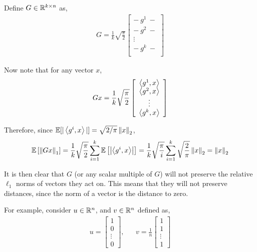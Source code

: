 \documentclass[10pt]{article}
\begin{document}
\begin{solution}[Solution]
    Define \( G\in\mathbb{R}^{k\times n} \) as, 
\begin{align*}
    G = \frac{1}{k} \sqrt{\frac{\pi}{2}} \left[\begin{array}{c}
    -\: g^1 \: - \\
    -\: g^2 \: - \\
    \vdots \\
    -\: g^k \: - \\
    \end{array}\right]
\end{align*}

Now note that for any vector \( x \),
\begin{align*}
    Gx = \frac{1}{k} \sqrt{\frac{\pi}{2}} \left[\begin{array}{c} \left\langle g^1,x \right\rangle \\ \left\langle g^2,x \right\rangle \\ \vdots \\ \left\langle g^k,x \right\rangle\end{array}\right]
\end{align*}

    Therefore, since \( \mathbb{E}[|\left\langle g^i,x \right\rangle|] = \sqrt{2/\pi} \left\lVert x\right\rVert_2 \),
\begin{align*}
    \mathbb{E} \left[\left\lVert Gx\right\rVert_1\right] 
    = \frac{1}{k} \sqrt{\frac{\pi}{2}} \sum_{i=1}^{k} \mathbb{E}\left[\left|\left\langle g^i,x \right\rangle\right|\right]
    = \frac{1}{k} \sqrt{\frac{\pi}{i}} \sum_{i=1}^{k} \sqrt{\frac{2}{\pi}}\left\lVert x\right\rVert_2
    = \left\lVert x\right\rVert_2
\end{align*}
    
It is then clear that \( G \) (or any scalar multiple of \( G \)) will not preserve the relative \( \ell_1 \) norms of vectors they act on. This means that they will not preserve distances, since the norm of a vector is the distance to zero.

For example, consider \( u\in\mathbb{R}^n \), and \( v\in\mathbb{R}^n \) defined as,
\begin{align*}
    u = \left[\begin{array}{c}
    1  \\ 0 \\ \vdots \\ 0 \end{array}\right]
    ,&&
    v = \frac{1}{n} \left[\begin{array}{c}1\\1 \\\vdots \\ 1\end{array}\right]
\end{align*}


\end{solution}
\end{document}
